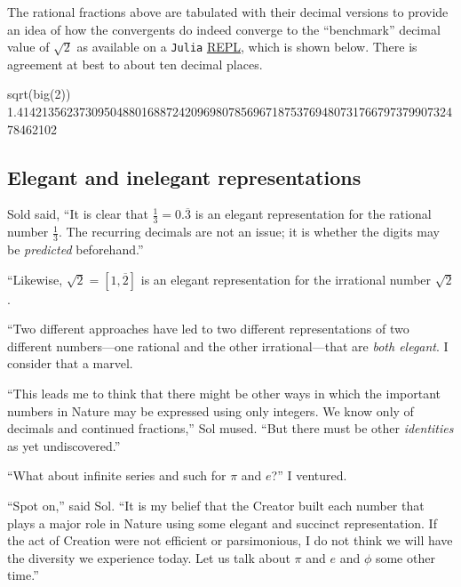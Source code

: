 \documentclass[
  a4paper,
]{article}
\newenvironment{Shaded}{\begin{snugshade}}{\end{snugshade}}
\newcommand{\FloatTok}[1]{\textcolor[rgb]{0.75,0.75,0.82}{#1}}
\newcommand{\FunctionTok}[1]{\textcolor[rgb]{0.94,0.94,0.56}{#1}}
\newcommand{\NormalTok}[1]{\textcolor[rgb]{0.80,0.80,0.80}{#1}}
\begin{document}
The rational fractions above are tabulated with their decimal versions
to provide an idea of how the convergents do indeed converge to the
``benchmark'' decimal value of \(\sqrt{2}\) as available on a
\texttt{Julia}
\href{https://en.wikipedia.org/wiki/Read\%E2\%80\%93eval\%E2\%80\%93print_loop}{REPL},
which is shown below. There is agreement at best to about ten decimal
places.

\begin{Shaded}
\begin{Highlighting}[]
\FunctionTok{sqrt}\NormalTok{(}\FunctionTok{big}\NormalTok{(}\FloatTok{2}\NormalTok{))}
\FloatTok{1.414213562373095048801688724209698078569671875376948073176679737990732478462102}
\end{Highlighting}
\end{Shaded}

\subsection{Elegant and inelegant
representations}\label{elegant-and-inelegant-representations}

Sold said, ``It is clear that \(\tfrac{1}{3} = 0.\overline{3}\) is an
elegant representation for the rational number \(\tfrac{1}{3}\). The
recurring decimals are not an issue; it is whether the digits may be
\emph{predicted} beforehand.''

``Likewise, \(\sqrt{2} = [1, \overline{2}]\) is an elegant
representation for the irrational number \(\sqrt{2}\).

``Two different approaches have led to two different representations of
two different numbers---one rational and the other irrational---that are
\emph{both elegant}. I consider that a marvel.

``This leads me to think that there might be other ways in which the
important numbers in Nature may be expressed using only integers. We
know only of decimals and continued fractions,'' Sol mused. ``But there
must be other \emph{identities} as yet undiscovered.''

``What about infinite series and such for \(\pi\) and \(e\)?'' I
ventured.

``Spot on,'' said Sol. ``It is my belief that the Creator built each
number that plays a major role in Nature using some elegant and succinct
representation. If the act of Creation were not efficient or
parsimonious, I do not think we will have the diversity we experience
today. Let us talk about \(\pi\) and \(e\) and \(\phi\) some other
time.''
\end{document}
